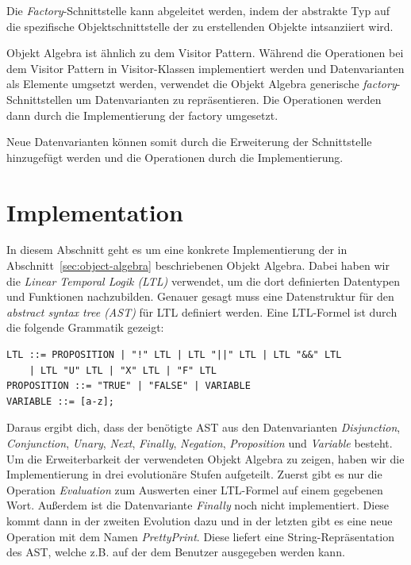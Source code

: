 \documentclass{llncs}
\begin{document}
Die \textit{Factory}-Schnittstelle kann abgeleitet werden, indem der abstrakte Typ auf die spezifische Objektschnittstelle der zu erstellenden Objekte intsanziiert wird.

Objekt Algebra ist ähnlich zu dem Visitor Pattern. Während die Operationen bei dem Visitor Pattern in Visitor-Klassen implementiert werden und Datenvarianten als Elemente umgsetzt werden, verwendet die Objekt Algebra generische \textit{factory}-Schnittstellen um Datenvarianten zu repräsentieren. Die Operationen werden dann durch die Implementierung der factory umgesetzt.

Neue Datenvarianten können somit durch die Erweiterung der Schnittstelle hinzugefügt werden und die Operationen durch die Implementierung.


\section{Implementation} \label{sec:implementation}
In diesem Abschnitt geht es um eine konkrete Implementierung der in Abschnitt~\ref{sec:object-algebra} beschriebenen Objekt Algebra.
Dabei haben wir die \emph{Linear Temporal Logik (LTL)} \cite{pnueli77} verwendet, um die dort definierten Datentypen und Funktionen nachzubilden.
Genauer gesagt muss eine Datenstruktur für den \emph{abstract syntax tree (AST)} für LTL definiert werden.
Eine LTL-Formel ist durch die folgende Grammatik gezeigt:

\begin{lstlisting}
LTL ::= PROPOSITION | "!" LTL | LTL "||" LTL | LTL "&&" LTL
	| LTL "U" LTL | "X" LTL | "F" LTL
PROPOSITION ::= "TRUE" | "FALSE" | VARIABLE
VARIABLE ::= [a-z];
\end{lstlisting}\label{lst:grammar}

Daraus ergibt dich, dass der benötigte AST aus den Datenvarianten \emph{Disjunction}, \emph{Conjunction}, \emph{Unary}, \emph{Next}, \emph{Finally}, \emph{Negation}, \emph{Proposition} und \emph{Variable} besteht.
Um die Erweiterbarkeit der verwendeten Objekt Algebra zu zeigen, haben wir die Implementierung in drei evolutionäre Stufen aufgeteilt.
Zuerst gibt es nur die Operation \emph{Evaluation} zum Auswerten einer LTL-Formel auf einem gegebenen Wort. Außerdem ist die Datenvariante \emph{Finally} noch nicht implementiert.
Diese kommt dann in der zweiten Evolution dazu und in der letzten gibt es eine neue Operation mit dem Namen \emph{PrettyPrint}.
Diese liefert eine String-Repräsentation des AST, welche z.B. auf der dem Benutzer ausgegeben werden kann.
\end{document}
